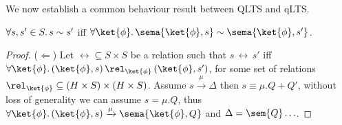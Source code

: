 We now establish a common behaviour result between QLTS and qLTS.
\begin{theorem}
  $\forall s, s' \in S \ldotp s \sim s'$ iff $\forall \ket{\phi} \ldotp \sema{\ket{\phi}, s} \sim \sema{\ket{\phi}, s'}$.
\end{theorem}
\begin{proof}
  ($\Longleftarrow$) Let $\rel \subseteq S \times S$ be a relation such that $s\,\rel\,s'$ iff $\forall \ket{\phi} \ldotp (\ket{\phi}, s)\,\rel_{\ket{\phi}}\,(\ket{\phi}, s')$,
  for some set of relations $\rel_{\ket{\phi}} \subseteq (H \times S) \times (H \times S)$.
  Assume $s \xrightarrow{\mu} \Delta$ then $s \equiv \mu.Q + Q'$, without loss of generality we can assume $s = \mu.Q$,
  thus $\forall \ket{\phi} \ldotp (\ket{\phi}, s) \xrightarrow{\mu} \sema{\ket{\phi}, Q}$ and $\Delta = \sem{Q} \ldots$.
\end{proof}
